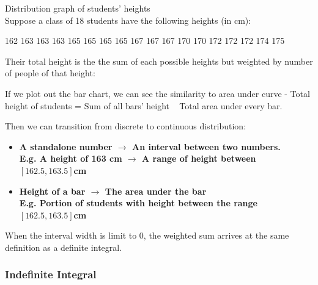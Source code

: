 \documentclass[class=article, crop=false, 12pt]{standalone}
\begin{document}



\begin{example} Distribution graph of students' heights\\[1em]

    Suppose a class of 18 students have the following heights (in cm):

    \begin{center}
        162 163 163 163 165 165 165 165 167 167 167 170 170 172 172 172 174 175
    \end{center}

    Their total height is the the sum of each possible heights but weighted by number of people of that height:

    If we plot out the bar chart, we can see the similarity to area under curve - 
    Total height of students = Sum of all bars' height ~ Total area under every bar. 


\end{example}

Then we can transition from discrete to continuous distribution: 
\begin{itemize}
    \item \bf{A standalone number $\rightarrow$ An interval between two numbers.}\\
    E.g. A height of 163 cm $\rightarrow$ A range of height between $[162.5, 163.5] $cm

    \item \bf{Height of a bar $\rightarrow$ The area under the bar}\\
    E.g. Portion of students with height between the range $[162.5, 163.5] $cm
\end{itemize}

When the interval width is limit to $0$, the weighted sum arrives at the same definition as a definite integral. 


\subsubsection{Indefinite Integral}
\end{document}
